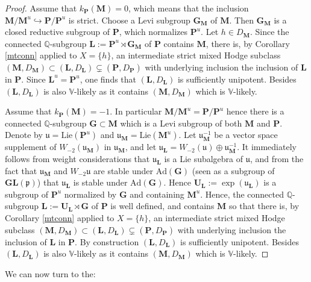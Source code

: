 \documentclass[10pt]{article}
\numberwithin{equation}{subsection}
\theoremstyle{plain}
\theoremstyle{definition}
\theoremstyle{remark}
\newcommand{\lie}{\mathrm{Lie}}
\newcommand{\Q}{\mathbb Q}
\newcommand{\V}{\mathbb V}
\newcommand{\G}{\mathbf G}
\newcommand{\pp}{\mathbf P}
\newcommand{\uu}{\mathbf U}
\newcommand{\M}{\mathbf M}
\newcommand{\LL}{\mathbf L}
\newcommand{\gl}{\mathbf{GL}}
\newcommand{\para}{\mathfrak{p}}
\newcommand{\lieu}{\mathfrak{u}}
\newcommand{\Ad}{\mathrm{Ad}}
\begin{document}
\begin{proof}
Assume that $k_\pp(\M) = 0$, which means that the inclusion $\M/\M^u \hookrightarrow \pp/\pp^u$ is strict. Choose a Levi subgroup $\G_\M$ of $\M$. Then $\G_\M$ is a closed reductive subgroup of $\pp$, which normalizes $\pp^u$. Let $h \in D_\M$. Since the connected $\Q$-subgroup $\LL := \pp^u \rtimes \G_\M$ of $\pp$ contains $\M$, there is, by Corollary \ref{mtconn} applied to $X = \{h\}$, an intermediate strict mixed Hodge subclass $(\M, D_\M) \subset (\LL,D_\LL) \subsetneq (\pp, D_\pp)$ with underlying inclusion the inclusion of $\LL$ in $\pp$. Since $\LL^u = \pp^u$, one finds that $(\LL, D_\LL)$ is sufficiently unipotent. Besides $(\LL, D_\LL)$ is also $\V$-likely as it contains $(\M, D_\M)$ which is $\V$-likely. 

Assume that $k_\pp(\M) = -1$. In particular $\M/\M^u = \pp/\pp^u$ hence there is a connected $\Q$-subgroup $\G \subset \M$ which is a Levi subgroup of both $\M$ and $\pp$. Denote by $\lieu = \lie(\pp^u)$ and $\lieu_\M = \lie(\M^u)$. Let $\lieu_\M^{-1}$ be a vector space supplement of $W_{-2}(\lieu_\M)$ in $\lieu_\M$, and let $\lieu_\LL = W_{-2}(\lieu) \oplus \lieu_\M^{-1}$. It immediately follows from weight considerations that $\lieu_\LL$ is a Lie subalgebra of $\lieu$, and from the fact that $\lieu_\M$ and $W_{-2} \lieu$ are stable under $\Ad(\G)$ (seen as a subgroup of $\gl(\para)$) that $\lieu_\LL$ is stable under $\Ad(\G)$. Hence $\uu_\LL := \exp(\lieu_\LL)$ is a subgroup of $\pp^u$ normalized by $\G$ and containing $\M^u$. Hence, the connected $\Q$-subgroup $\LL := \uu_\LL \rtimes \G$ of $\pp$ is well defined, and contains $\M$ so that there is, by Corollary \ref{mtconn} applied to $X = \{h\}$, an intermediate strict mixed Hodge subclass $(\M, D_\M) \subset (\LL,D_\LL) \subsetneq (\pp, D_\pp)$ with underlying inclusion the inclusion of $\LL$ in $\pp$. By construction $(\LL,D_\LL)$ is sufficiently unipotent. Besides $(\LL, D_\LL)$ is also $\V$-likely as it contains $(\M, D_\M)$ which is $\V$-likely. 
\end{proof}
We can now turn to the:
\end{document}
